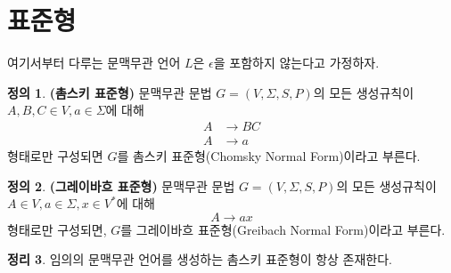 \documentclass[b5paper, 11pt]{book}
\theoremstyle{definition}
\newtheorem{defn}{정의}[chapter]
\newtheorem{thm}[defn]{정리}
\begin{document}
\section{표준형}
여기서부터 다루는 문맥무관 언어 $L$은 $\epsilon$을 포함하지 않는다고 가정하자. 
\begin{defn}
    \textbf{(촘스키 표준형)} 문맥무관 문법 $G = (V, \Sigma, S, P)$의 모든
    생성규칙이 $A, B, C \in V, a \in \Sigma$에 대해 
    \begin{align*}
        A &\rightarrow BC \\ 
        A &\rightarrow a 
    \end{align*}
    형태로만 구성되면 $G$를 촘스키 표준형(Chomsky Normal Form)이라고 부른다. 
\end{defn}
\begin{defn}
    \textbf{(그레이바흐 표준형)} 문맥무관 문법 $G = (V, \Sigma, S,P)$의 모든
    생성규칙이 $A\in V, a\in\Sigma , x \in V^*$에 대해
    $$A \rightarrow ax$$
    형태로만 구성되면, $G$를 그레이바흐 표준형(Greibach Normal Form)이라고 부른다.
\end{defn}
\begin{thm}
    임의의 문맥무관 언어를 생성하는 촘스키 표준형이 항상 존재한다. 
\end{thm}
\end{document}
